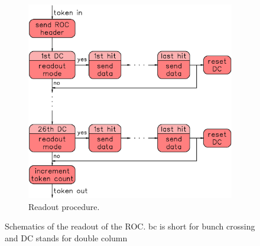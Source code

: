 \documentclass[british,11pt,a4paper]{memoir}
\begin{document}
\begin{figure}[ht]
\begin{subfigure}[b]{0.57\textwidth}
		\includegraphics[width=\textwidth]{token}
		\caption{Readout procedure.}
		\label{ptok}
	\end{subfigure}
	\caption{Schematics of the readout of the \ac{ROC}. bc is short for bunch crossing and DC stands for double column}
	\label{pro}
\end{figure}
\end{document}
